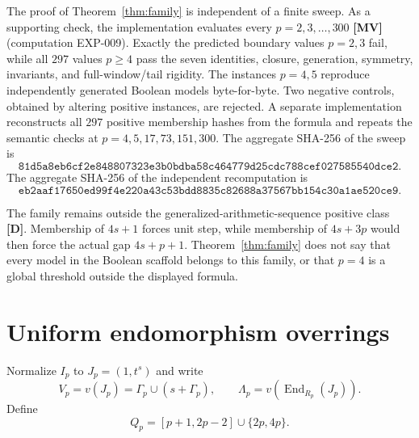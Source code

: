 \documentclass[11pt]{article}
\theoremstyle{definition}
\theoremstyle{remark}
\begin{document}
The proof of Theorem~\ref{thm:family} is independent of a finite sweep. As a supporting check,
the implementation evaluates every $p=2,3,\ldots,300$ \textbf{[MV]} (computation EXP-009).
Exactly the predicted boundary values $p=2,3$ fail, while all $297$ values $p\ge4$ pass the seven
identities, closure, generation, symmetry, invariants, and full-window/tail rigidity. The
instances $p=4,5$ reproduce independently generated Boolean models byte-for-byte. Two negative
controls, obtained by altering positive instances, are rejected. A separate implementation
reconstructs all $297$ positive membership hashes from the formula and repeats the semantic checks
at $p=4,5,17,73,151,300$. The aggregate SHA-256 of the sweep is
\[
\texttt{81d5a8eb6cf2e848807323e3b0bdba58c464779d25cdc788cef027585540dce2}.
\]
The aggregate SHA-256 of the independent recomputation is
\[
\texttt{eb2aaf17650ed99f4e220a43c53bdd8835c82688a37567bb154c30a1ae520ce9}.
\]

The family remains outside the generalized-arithmetic-sequence positive class \textbf{[D]}.
Membership of $4s+1$ forces unit step, while membership of $4s+3p$ would then force the actual gap
$4s+p+1$. Theorem~\ref{thm:family} does not say that every model in the Boolean scaffold belongs
to this family, or that $p=4$ is a global threshold outside the displayed formula.

\section{Uniform endomorphism overrings}

Normalize $I_p$ to $J_p=(1,t^s)$ and write
\[
V_p=v(J_p)=\Gamma_p\cup(s+\Gamma_p),\qquad
\Lambda_p=v(\operatorname{End}_{R_p}(J_p)).
\]
Define
\[
Q_p=[p+1,2p-2]\cup\{2p,4p\}.
\]
\end{document}
